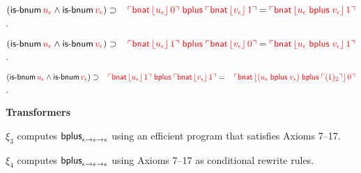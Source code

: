 \documentclass[fleqn,11pt]{article}
\begin{document}
    \item $(\mbox{\sf is-bnum} \, \textcolor{red}{u_\epsilon} \wedge \mbox{\sf is-bnum}
      \, \textcolor{red}{v_\epsilon}) \supset {}\\
        \hspace*{2ex} \textcolor{red}{\ulcorner\mbox{\sf bnat} \,
            \lfloor u_\epsilon\rfloor \, 0\urcorner \; \mbox{\sf bplus} \;
          \ulcorner\mbox{\sf bnat} \, \lfloor v_\epsilon\rfloor \, 1\urcorner} =
        \textcolor{red}{\ulcorner\mbox{\sf bnat} \, \lfloor u_\epsilon \;
              \mbox{\sf bplus} \; v_\epsilon\rfloor \, 1\urcorner}$.

    \item $(\mbox{\sf is-bnum} \, \textcolor{red}{u_\epsilon} \wedge \mbox{\sf is-bnum}
      \, \textcolor{red}{v_\epsilon}) \supset {}\\
        \hspace*{2ex} \textcolor{red}{\ulcorner\mbox{\sf bnat} \,
            \lfloor u_\epsilon\rfloor \, 1\urcorner \; \mbox{\sf bplus} \;
          \ulcorner\mbox{\sf bnat} \, \lfloor v_\epsilon\rfloor \, 0\urcorner} =
        \textcolor{red}{\ulcorner\mbox{\sf bnat} \, \lfloor u_\epsilon \;
              \mbox{\sf bplus} \; v_\epsilon\rfloor \, 1\urcorner}$.

    \item $(\mbox{\sf is-bnum} \, \textcolor{red}{u_\epsilon} \wedge \mbox{\sf is-bnum}
      \, \textcolor{red}{v_\epsilon}) \supset {}\\
        \hspace*{2ex} \textcolor{red}{\ulcorner\mbox{\sf bnat} \,
            \lfloor u_\epsilon\rfloor \, 1\urcorner \; \mbox{\sf bplus} \;
          \ulcorner\mbox{\sf bnat} \, \lfloor v_\epsilon\rfloor \, 1\urcorner} = {}\\
        \hspace*{2ex}\textcolor{red}{\ulcorner\mbox{\sf bnat} \,
            \lfloor(u_\epsilon \; \mbox{\sf bplus} \; v_\epsilon)
              \; \mbox{\sf bplus} \; \ulcorner(1)_2\urcorner\rfloor \, 0\urcorner}$.

  \ee

  \item[] \textbf{Transformers}

  \be

      \setcounter{enumi}{2}

    \item $\xi_3$ computes $\mbox{\sf bplus}_{\epsilon \rightarrow \epsilon
      \rightarrow \epsilon}$ using an efficient program that
      satisfies Axioms 7--17.

    \item $\xi_4$ computes $\mbox{\sf bplus}_{\epsilon \rightarrow \epsilon
      \rightarrow \epsilon}$ using Axioms 7--17 as conditional rewrite
      rules.
\end{document}
